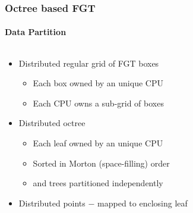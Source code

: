 \begin{frame}
\frametitle{Octree based FGT}
\framesubtitle{Data Partition}
\begin{columns}[T]
\begin{column}{0.6\textwidth}
\begin{itemize}
\item Distributed regular grid of FGT boxes
\begin{itemize}
\item Each box owned by an unique CPU
\item Each CPU owns a sub-grid of boxes
\newline
\end{itemize}
\item Distributed octree
\begin{itemize}
\item Each leaf owned by an unique CPU
\item Sorted in Morton (space-filling) order
\item {\color{blue}{Direct}} and {\color{green!65!black}{Expand}} trees partitioned independently
\newline
\end{itemize}
\item Distributed points $-$ mapped to enclosing leaf
\end{itemize}
\end{column}
\begin{column}{0.4\textwidth}

\newline

\end{column}
\end{columns}
\end{frame}

